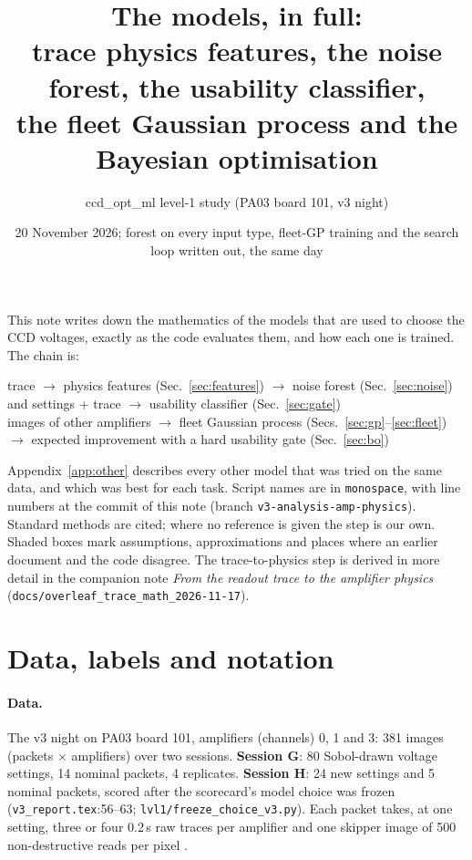 \documentclass[10pt,a4paper]{article}
\title{The models, in full:\\ trace physics features, the noise forest, the usability classifier,\\ the fleet Gaussian process and the Bayesian optimisation}
\author{ccd\_opt\_ml level-1 study (PA03 board 101, v3 night)}
\date{20 November 2026; forest on every input type, fleet-GP training and the search loop written out, the same day}
\newcommand{\code}[1]{\texttt{\small #1}}
\begin{document}
\maketitle

\noindent This note writes down the mathematics of the models that are used to choose the CCD voltages, exactly as the
code evaluates them, and how each one is trained. The chain is:
\begin{center}\small
trace $\rightarrow$ physics features (Sec.~\ref{sec:features}) $\rightarrow$ noise forest (Sec.~\ref{sec:noise})
\quad and \quad
settings + trace $\rightarrow$ usability classifier (Sec.~\ref{sec:gate})\\[2pt]
images of other amplifiers $\rightarrow$ fleet Gaussian process (Secs.~\ref{sec:gp}--\ref{sec:fleet})
$\rightarrow$ expected improvement with a hard usability gate (Sec.~\ref{sec:bo})
\end{center}
Appendix~\ref{app:other} describes every other model that was tried on the same data, and which was best for each task.
Script names are in \code{monospace}, with line numbers at the commit of this note (branch
\code{v3-analysis-amp-physics}). Standard methods are cited; where no reference is given the step is our own. Shaded boxes
mark assumptions, approximations and places where an earlier document and the code disagree. The trace-to-physics step
is derived in more detail in the companion note \emph{From the readout trace to the amplifier physics}
(\code{docs/overleaf\_trace\_math\_2026-11-17}).

\tableofcontents

\section{Data, labels and notation}\label{sec:data}

\paragraph{Data.} The v3 night on PA03 board 101, amplifiers (channels) 0, 1 and 3: 381 images (packets $\times$
amplifiers) over two sessions. \textbf{Session G}: 80 Sobol-drawn voltage settings, 14 nominal packets, 4 replicates.
\textbf{Session H}: 24 new settings and 5 nominal packets, scored after the scorecard's model choice was frozen
(\code{v3\_report.tex}:56--63; \code{lvl1/freeze\_choice\_v3.py}). Each packet takes, at one setting, three or four
0.2\,s raw traces per amplifier and one skipper image of 500 non-destructive reads per pixel \cite{tiffenberg2017}.
\end{document}
